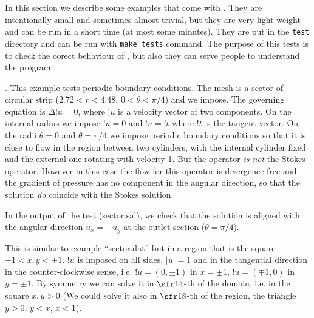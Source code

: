 
In this section we describe some examples that come with \pfem{}. They
are intentionally small and sometimes almost trivial, but they are
very light-weight and can be run in a short time (at most some
minutes). They are put in the \verb+test+ directory and can be run
with \verb+make tests+ command. The purpose of this tests is to check
the corect behaviour of \pfem{}, but also they can serve people to
understand the program. 


.  This example tests periodic boundary
conditions. The mesh is a sector of circular strip ($2.72 < r <
4.48$, $0 < \theta < \pi/4$) and we impose. The governing equation is
$\Delta !u=0$, where $!u$ is a velocity vector of two components.  On
the internal radius we impose $!u=0$ and $!u=!t$ where $!t$ is the
tangent vector. On the radii $\theta=0$ and $\theta=\pi/4$ we impose
periodic boundary conditions so that it is close to flow in the region
between two cylinders, with the internal cylinder fixed and the
external one rotating with velocity 1. But the operator \emph{is not}
the Stokes operator. However in this case the flow for this operator
is divergence free and the gradient of pressure has no component in
the angular direction, so that the solution \emph{do} coincide with
the Stokes solution.

In the output of the test (sector.sal), we check that the solution
is aligned with the angular direction $u_x=-u_y$ at the outlet
section ($\theta = \pi/4$).


This is similar to example ``sector.dat'' but in a region that is the
square $-1<x,y<+1$. $!u$ is imposed on all sides, $|u|=1$ and in the
tangential direction in the counter-clockwise sense, i.e.
$!u=(0,\pm1)$ in $x=\pm1$, $!u=(\mp1,0)$ in $y=\pm1$. By symmetry we
can solve it in $\sfr14$-th of the domain, i.e. in the square $x,y>0$
(We could solve it also in $\sfr18$-th of the region, the triangle
$y>0$, $y<x$, $x<1$). 


